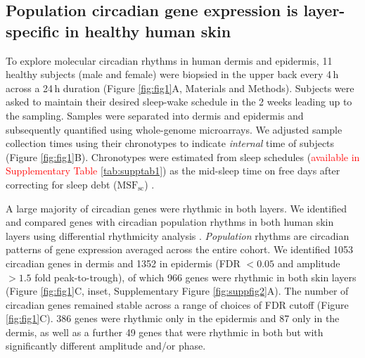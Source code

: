 \subsection*{Population circadian gene expression is layer-specific in healthy human skin} 
To explore molecular circadian rhythms in human dermis and epidermis, 11 healthy subjects (male and female) were biopsied in the upper back every 4\,h across a 24\,h duration (Figure \ref{fig:fig1}A, Materials and Methods). Subjects were asked to maintain their desired sleep-wake schedule in the 2 weeks leading up to the sampling. Samples were separated into dermis and epidermis and subsequently quantified using whole-genome microarrays. We adjusted sample collection times using their chronotypes to indicate \emph{internal} time of subjects (Figure \ref{fig:fig1}B). Chronotypes were estimated from sleep schedules (\textcolor{red}{available in Supplementary Table \ref{tab:supptab1}}) as the mid-sleep time on free days after correcting for sleep debt ($\textrm{MSF}_\textrm{sc}$) \cite{Vetter2021}. 

A large majority of circadian genes were rhythmic in both layers. We identified and compared genes with circadian population rhythms in both human skin layers using differential rhythmicity analysis \cite{Pelikan2021}. \textit{Population} rhythms are circadian patterns of gene expression averaged across the entire cohort. We identified 1053 circadian genes in dermis and 1352 in epidermis (FDR $<0.05$ and amplitude $>1.5$ fold peak-to-trough), of which 966 genes were rhythmic in both skin layers (Figure \ref{fig:fig1}C, inset, Supplementary Figure \ref{fig:suppfig2}A). The number of circadian genes remained stable across a range of choices of FDR cutoff (Figure \ref{fig:fig1}C). 386 genes were rhythmic only in the epidermis and 87 only in the dermis, as well as a further 49 genes that were rhythmic in both but with significantly different amplitude and/or phase.

